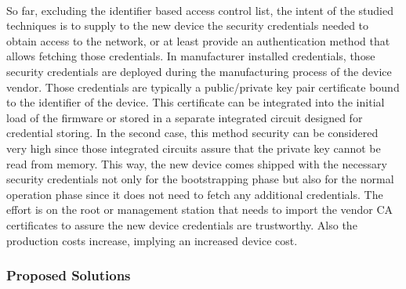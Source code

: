 \paragraph{}
So far, excluding the identifier based access control list, the intent of the studied techniques is to supply to the new device the security credentials needed to obtain access to the network, or at least provide an authentication method that allows fetching those credentials. In manufacturer installed credentials, those security credentials are deployed during the manufacturing process of the device vendor. Those credentials are typically a public/private key pair certificate bound to the identifier of the device. This certificate can be integrated into the initial load of the firmware or stored in a separate integrated circuit designed for credential storing. In the second case, this method security can be considered very high since those integrated circuits assure that the private key cannot be read from memory. This way, the new device comes shipped with the necessary security credentials not only for the bootstrapping phase but also for the normal operation phase since it does not need to fetch any additional credentials. The effort is on the root or management station that needs to import the vendor CA certificates to assure the new device credentials are trustworthy. Also the production costs increase, implying an increased device cost.

\subsubsection{Proposed Solutions}
